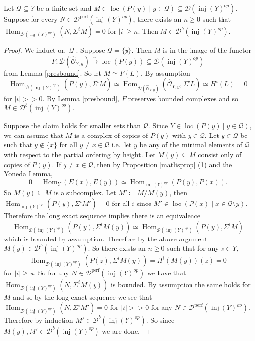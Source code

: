 \documentclass[12pt,oneside]{amsart}
\DeclareMathOperator{\Hom}{Hom}
\DeclareMathOperator{\loc}{loc}
\DeclareMathOperator{\perf}{perf}
\DeclareMathOperator{\inj}{inj}
\begin{document}
\begin{lemma} \label{boundedchar}
Let $\mathcal{Q} \subseteq Y$ be a finite set and ${M \in \loc(P(y) \mid y \in \mathcal{Q})} \subseteq \mathcal{D}(\inj(Y)^{op})$. Suppose for every $N \in \mathcal{D}^{\perf}(\inj(Y)^{op})$, there exists an $n \geq 0$ such that $\Hom_{\mathcal{D}(\inj(Y)^{op})}(N,\Sigma^i M) = 0$ for $\lvert i \rvert \geq n$.  Then $M \in \mathcal{D}^b(\inj(Y)^{op})$. 
\end{lemma}

\begin{proof}
We induct on $\lvert \mathcal{Q} \rvert$. Suppose $\mathcal{Q} = \{y\}$. Then $M$ is in the image of the functor 
\[
F: \mathcal{D}(\widehat{\mathcal{O}}_{Y,y}) \xrightarrow{\sim} \loc(P(y)) \subseteq \mathcal{D}(\inj(Y)^{op})
\]
from Lemma \ref{presbound}. So let $M \simeq F(L)$. By assumption 
\[
\Hom_{\mathcal{D}(\inj(Y)^{op})}(P(y),\Sigma^i M) \simeq \Hom_{\mathcal{D}(\widehat{\mathcal{O}}_{Y,y})}\left(\widehat{\mathcal{O}}_{Y,y},\Sigma^i L\right) \simeq H^i(L) = 0
\]
for $\lvert i \rvert >> 0$. By Lemma \ref{presbound}, $F$ preserves bounded complexes and so $M \in \mathcal{D}^b(\inj(Y)^{op})$. 

Suppose the claim holds for smaller sets than $\mathcal{Q}$. Since $Y \in \loc(P(y) \mid y \in \mathcal{Q})$, we can assume that $M$ is a complex of copies of $P(y)$ with $y \in \mathcal{Q}$. Let $y \in \mathcal{Q}$ be such that $y \not \in \overline{\{x\}}$ for all $y \neq x  \in \mathcal{Q}$ i.e.\ let $y$ be any of the minimal elements of $\mathcal{Q}$ with respect to the partial ordering by height. Let $M(y) \subseteq M$ consist only of copies of $P(y)$. If $y \neq x \in \mathcal{Q}$, then by Proposition \ref{matlisprop} (1) and the Yoneda Lemma,
\[
0 = \Hom_Y(E(x),E(y)) \simeq \Hom_{\inj(Y)^{op}}(P(y),P(x)).
\]
So $M(y) \subseteq M$ is a subcomplex. Let $M' \coloneq M/M(y)$, then $\Hom_{\inj(Y)^{op}}(P(y),\Sigma^i M') = 0$ for all $i$ since $M' \in \loc(P(x) \mid x \in \mathcal{Q} \setminus y)$. Therefore the long exact sequence implies there is an equivalence
\[
\Hom_{\mathcal{D}(\inj(Y)^{op})}(P(y),\Sigma^i M(y))  \simeq \Hom_{\mathcal{D}(\inj(Y)^{op})}(P(y),\Sigma^i M) 
\]
which is bounded by assumption. Therefore by the above argument $M(y) \in \mathcal{D}^b(\inj(Y)^{op})$. So there exists an $n \geq 0$ such that for any $z \in Y$, 
\[
\Hom_{\mathcal{D}(\inj(Y)^{op})}(P(z),\Sigma^i M(y)) = H^i(M(y))(z) = 0
\]
for $\lvert i \rvert \geq n$. So for any $N \in \mathcal{D}^{\perf}(\inj(Y)^{op})$ we have that $\Hom_{\mathcal{D}(\inj(Y)^{op})}(N,\Sigma^i M(y))$ is bounded. By assumption the same holds for $M$ and so by the long exact sequence we see that $\Hom_{\mathcal{D}(\inj(Y)^{op})}(N,\Sigma^i M') = 0$ for $\lvert i \rvert >> 0$ for any $N \in \mathcal{D}^{\perf}(\inj(Y)^{op})$. Therefore by induction $M' \in \mathcal{D}^b(\inj(Y)^{op})$. So since $M(y), M' \in \mathcal{D}^b(\inj(Y)^{op})$ we are done. 
\end{proof}
\end{document}
